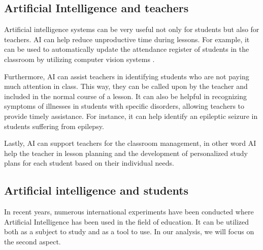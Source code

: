 \documentclass[a4paper,12pt]{article}
\begin{document}
\subsection{Artificial Intelligence and teachers}
Artificial intelligence systems can be very useful not only for students but also for teachers. AI can help reduce unproductive time during lessons. For example, it can be used to automatically update the attendance register of students in the classroom by utilizing computer vision systems \cite{dimitriadou2023critical}.

Furthermore, AI can assist teachers in identifying students who are not paying much attention in class. This way, they can be called upon by the teacher and included in the normal course of a lesson. It can also be helpful in recognizing symptoms of illnesses in students with specific disorders, allowing teachers to provide timely assistance. For instance, it can help identify an epileptic seizure in students suffering from epilepsy\cite{dimitriadou2023critical}.

Lastly, AI can support teachers for the classroom management, in other word AI help the teacher in lesson planning and the development of personalized study plans for each student based on their individual needs.

\subsection{Artificial intelligence and students}
In recent years, numerous international experiments have been conducted where Artificial Intelligence has been used in the field of education. It can be utilized both as a subject to study and as a tool to use\cite{cesaretti2021intelligenza}. 
In our analysis, we will focus on the second aspect.
\end{document}
